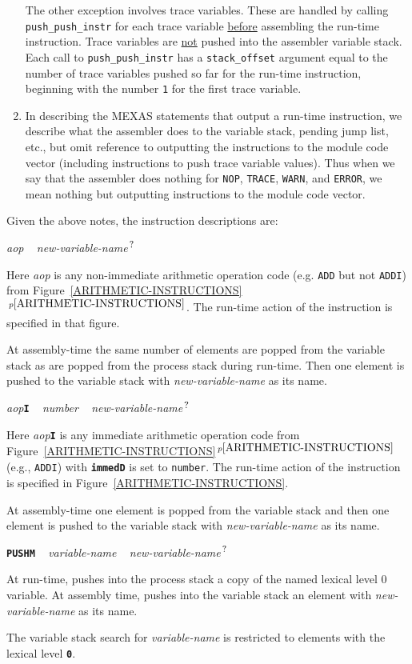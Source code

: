 \documentclass[12pt]{article}
\makeatletter
\newcommand{\TT}[1]{{\tt \bfseries #1}}
\newcommand{\QMARK}{{$^{\,\mbox{\footnotesize ?}}$}}
\newcommand{\ttkey}[1]{\TT{#1}\index{#1@{\tt #1}}}
\newcommand{\itemref}[1]{\ref{#1}$\,^{p\pageref{#1}}$}
\newcommand{\EOL}{\penalty \exhyphenpenalty}
\newenvironment{indpar}[1][0.3in]%
	{\begin{list}{}%
		     {\setlength{\itemsep}{0in}%
		      \setlength{\topsep}{0in}%
		      \setlength{\parsep}{1ex}%
		      \setlength{\labelwidth}{#1}%
		      \setlength{\leftmargin}{#1}%
		      \addtolength{\leftmargin}{\labelsep}}%
	 \item}%
	{\end{list}}
\makeatother
\begin{document}
\begin{enumerate}
The other exception involves trace variables.  These are handled by
calling {\tt push\_push\_\EOL instr} for each trace variable \underline{before}
assembling the run-time instruction.  Trace variables are \underline{not}
pushed into the assembler variable stack.
Each call to {\tt push\_push\_instr} has a {\tt stack\_offset} argument
equal to the number of trace variables pushed so far for the run-time
instruction, beginning with the number {\tt 1} for the first trace variable.
\item
In describing the MEXAS statements that output a run-time instruction,
we describe what the assembler does to the variable stack, pending
jump list, etc., but omit reference to outputting the instructions to the
module code vector (including instructions to push trace variable values).
Thus when we say that the assembler does nothing for {\tt NOP}, {\tt TRACE},
{\tt WARN}, and {\tt ERROR},
we mean nothing but outputting instructions to the module code vector.
\end{enumerate}


Given the above notes, the instruction descriptions are:

{\em aop} ~ {\em new-variable-name}\QMARK{}
\begin{indpar}
Here {\em aop} is any non-immediate
arithmetic operation code (e.g. {\tt ADD} but not {\tt ADDI}) from
Figure~\itemref{ARITHMETIC-INSTRUCTIONS}.
The run-time
action of the instruction is specified in that figure.

At assembly-time the same number of elements are popped from the variable stack
as are popped from the process stack during run-time.
Then one element is pushed to the variable stack with
{\em new-variable-name} as its name.
\end{indpar}

{\em aop}\TT{I} ~ {\em number} ~ {\em new-variable-name}\QMARK{}
\begin{indpar}
Here {\em aop}\TT{I} is any immediate arithmetic operation code from
Figure~\itemref{ARITHMETIC-INSTRUCTIONS} (e.g., {\tt ADDI})
with \TT{immedD} is set to {\tt number}.
The run-time
action of the instruction is specified in
Figure~\ref{ARITHMETIC-INSTRUCTIONS}.

At assembly-time one element is popped from the variable stack and then
one element is pushed to the variable stack with
{\em new-variable-name} as its name.
\end{indpar}

\ttkey{PUSHM} ~ {\em variable-name} ~
              {\em new-variable-name}\QMARK{}
\begin{indpar}
At run-time, pushes into the process stack a copy of the named
lexical level 0 variable.
At assembly time, pushes into the variable stack an
element with {\em new-variable-name} as its name.

The variable stack search for {\em variable-name} is restricted to
elements with the lexical level \TT{0}.
\end{indpar}
\end{document}

